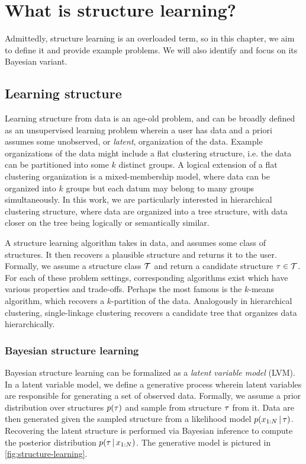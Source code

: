 \chapter{What is structure learning?}
Admittedly, structure learning is an overloaded term, so in this chapter, we aim to define it and provide example problems. We will also identify and focus on its Bayesian variant.

\section{Learning structure}
Learning structure from data is an age-old problem, and can be broadly defined as an unsupervised learning problem wherein a user has data
and a priori assumes some unobserved, or \emph{latent}, organization of the data. Example organizations of the data might include a flat clustering structure, i.e. the data can be partitioned into some $k$ distinct groups. A logical extension of a flat clustering organization is a mixed-membership model, where data can be organized into $k$ groups but each datum may belong to many groups simultaneously. 
In this work, we are particularly interested in hierarchical clustering structure, where data are organized into a tree structure, with data closer on the tree being logically or semantically similar.

A structure learning algorithm takes in data, and assumes some class of structures. It then recovers a plausible structure and returns it to the user. Formally, we assume a structure class $\mathcal{T}$ and return a candidate structure $\tau \in \mathcal{T}$.
For each of these problem settings, corresponding algorithms exist which have various properties and trade-offs. 
Perhaps the most famous is the $k$-means algorithm, which recovers a $k$-partition of the data.  Analogously in hierarchical clustering, single-linkage clustering recovers a candidate tree that organizes data hierarchically.

\subsection{Bayesian structure learning}
Bayesian structure learning can be formalized as a \emph{latent variable model} (LVM). In a latent variable model, we define a generative process
wherein latent variables are responsible for generating a set of observed data. Formally, we assume a prior distribution over structures $p(\tau)$
and sample from structure $\tau$ from it. Data are then generated
given the sampled structure from a likelihood model $p(x_{1:N}\,|\,\tau)$. Recovering the latent structure is performed via Bayesian inference to compute the posterior distribution $p(\tau\,|\,x_{1:N})$. The generative model is pictured in \autoref{fig:structure-learning}.

